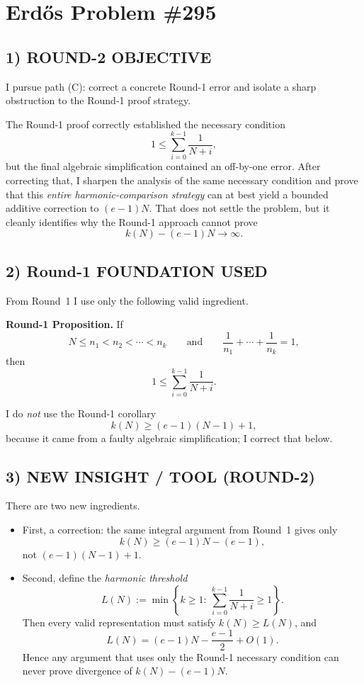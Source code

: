 \section{Erd\H{o}s Problem \#295}

\subsection*{1) ROUND-2 OBJECTIVE}

I pursue path (C): correct a concrete Round-1 error and isolate a sharp obstruction to the Round-1 proof strategy.

The Round-1 proof correctly established the necessary condition
\[
1\le \sum_{i=0}^{k-1}\frac1{N+i},
\]
but the final algebraic simplification contained an off-by-one error. After correcting that, I sharpen the analysis of the same necessary condition and prove that this \emph{entire harmonic-comparison strategy} can at best yield a bounded additive correction to $(e-1)N$. That does not settle the problem, but it cleanly identifies why the Round-1 approach cannot prove
\[
k(N)-(e-1)N\to\infty.
\]

\subsection*{2) Round-1 FOUNDATION USED}

From Round~1 I use only the following valid ingredient.

\medskip
\noindent\textbf{Round-1 Proposition.}
If
\[
N\le n_1<n_2<\cdots<n_k
\qquad\mbox{and}\qquad
\frac1{n_1}+\cdots+\frac1{n_k}=1,
\]
then
\[
1\le \sum_{i=0}^{k-1}\frac1{N+i}.
\]

I do \emph{not} use the Round-1 corollary
\[
k(N)\ge (e-1)(N-1)+1,
\]
because it came from a faulty algebraic simplification; I correct that below.

\subsection*{3) NEW INSIGHT / TOOL (ROUND-2)}

There are two new ingredients.

\begin{itemize}
\item First, a correction: the same integral argument from Round~1 gives only
\[
k(N)\ge (e-1)N-(e-1),
\]
not $(e-1)(N-1)+1$.
\item Second, define the \emph{harmonic threshold}
\[
L(N):=\min\left\{k\ge 1:\ \sum_{i=0}^{k-1}\frac1{N+i}\ge 1\right\}.
\]
Then every valid representation must satisfy $k(N)\ge L(N)$, and
\[
L(N)=(e-1)N-\frac{e-1}{2}+O(1).
\]
Hence any argument that uses only the Round-1 necessary condition can never prove divergence of $k(N)-(e-1)N$.
\end{itemize}

